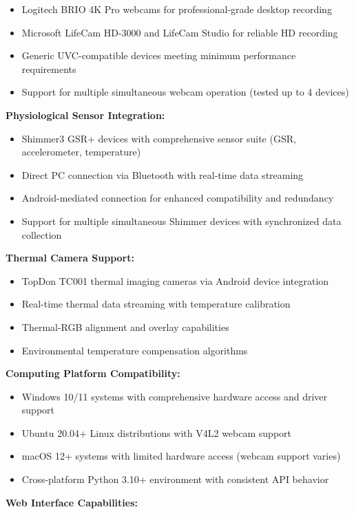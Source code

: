 \documentclass[11pt,a4paper]{article}
\begin{document}
\begin{itemize}
\item Logitech BRIO 4K Pro webcams for professional-grade desktop recording
\item Microsoft LifeCam HD-3000 and LifeCam Studio for reliable HD recording
\item Generic UVC-compatible devices meeting minimum performance requirements
\item Support for multiple simultaneous webcam operation (tested up to 4 devices)

\end{itemize}
\textbf{Physiological Sensor Integration:}

\begin{itemize}
\item Shimmer3 GSR+ devices with comprehensive sensor suite (GSR, accelerometer, temperature)
\item Direct PC connection via Bluetooth with real-time data streaming
\item Android-mediated connection for enhanced compatibility and redundancy
\item Support for multiple simultaneous Shimmer devices with synchronized data collection

\end{itemize}
\textbf{Thermal Camera Support:}

\begin{itemize}
\item TopDon TC001 thermal imaging cameras via Android device integration
\item Real-time thermal data streaming with temperature calibration
\item Thermal-RGB alignment and overlay capabilities
\item Environmental temperature compensation algorithms

\end{itemize}
\textbf{Computing Platform Compatibility:}

\begin{itemize}
\item Windows 10/11 systems with comprehensive hardware access and driver support
\item Ubuntu 20.04+ Linux distributions with V4L2 webcam support
\item macOS 12+ systems with limited hardware access (webcam support varies)
\item Cross-platform Python 3.10+ environment with consistent API behavior

\end{itemize}
\textbf{Web Interface Capabilities:}
\end{document}
